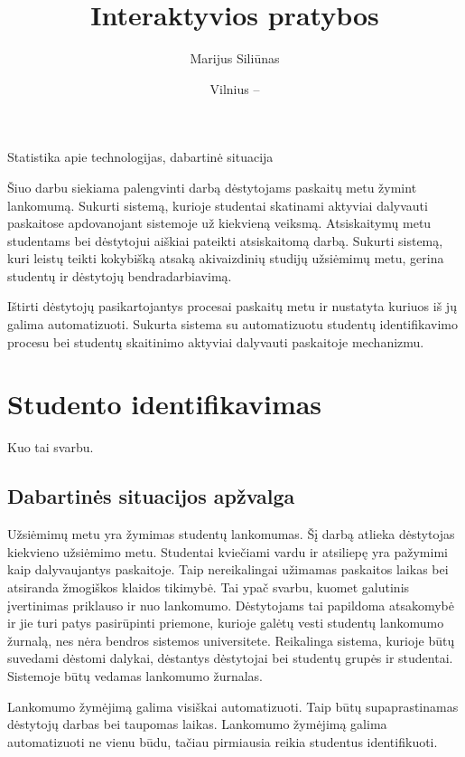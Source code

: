 \documentclass{VUMIFPSkursinis}
\title{Interaktyvios pratybos}
\author{Marijus Siliūnas}
\date{Vilnius – \the\year}
\begin{document}
\maketitle

\tableofcontents


Statistika apie technologijas, dabartinė situacija

Šiuo darbu siekiama palengvinti darbą dėstytojams paskaitų metu žymint lankomumą. Sukurti sistemą, kurioje studentai skatinami aktyviai dalyvauti paskaitose apdovanojant sistemoje už kiekvieną veiksmą. Atsiskaitymų metu studentams bei dėstytojui aiškiai pateikti atsiskaitomą darbą.
Sukurti sistemą, kuri leistų teikti kokybišką atsaką akivaizdinių studijų užsiėmimų metu, gerina studentų ir dėstytojų bendradarbiavimą.

Ištirti dėstytojų pasikartojantys procesai paskaitų metu ir nustatyta kuriuos iš jų galima automatizuoti. Sukurta sistema su automatizuotu studentų identifikavimo procesu bei studentų skaitinimo aktyviai dalyvauti paskaitoje mechanizmu. 

\section{Studento identifikavimas}

Kuo tai svarbu.

\subsection{Dabartinės situacijos apžvalga}

Užsiėmimų metu yra žymimas studentų lankomumas. Šį darbą atlieka dėstytojas kiekvieno užsiėmimo metu. Studentai kviečiami vardu ir atsiliepę yra pažymimi kaip dalyvaujantys paskaitoje. Taip nereikalingai užimamas paskaitos laikas bei atsiranda žmogiškos klaidos tikimybė. Tai ypač svarbu, kuomet galutinis įvertinimas priklauso ir nuo lankomumo. Dėstytojams tai papildoma atsakomybė ir jie turi patys pasirūpinti priemone, kurioje galėtų vesti studentų lankomumo žurnalą, nes nėra bendros sistemos universitete.  Reikalinga sistema, kurioje būtų suvedami dėstomi dalykai, dėstantys dėstytojai bei studentų grupės ir studentai. Sistemoje būtų vedamas lankomumo žurnalas.

Lankomumo žymėjimą galima visiškai automatizuoti. Taip būtų supaprastinamas dėstytojų darbas bei taupomas laikas. Lankomumo žymėjimą galima automatizuoti ne vienu būdu, tačiau pirmiausia reikia studentus identifikuoti.
\end{document}
